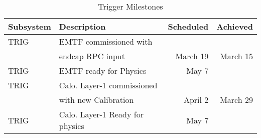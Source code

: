 \documentclass[12pt]{article}
\begin{document}
\begin{table}[h]
\caption{Trigger Milestones }
\begin{center}
\begin{tabular}{|l|l|r|r|}
\hline
Subsystem&Description&Scheduled&Achieved\\
\hline
TRIG&EMTF commissioned with & & \\
    & endcap RPC input & March 19 &  March 15 \\
\hline
TRIG&EMTF ready for Physics & May 7 &  \\
\hline
TRIG&Calo. Layer-1 commissioned &&\\
& with new Calibration  & April 2 & March 29 \\
\hline
TRIG&Calo. Layer-1 Ready for physics & May 7&  \\
\hline
\end{tabular}
\end{center}
\label{TriggerMilestones}
\end{table}%
\end{document}
